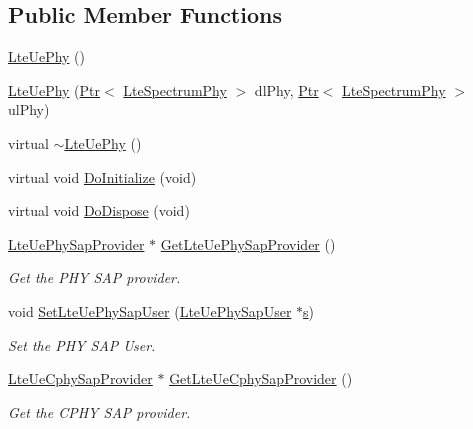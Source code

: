 \subsection*{Public Member Functions}
\begin{DoxyCompactItemize}
\item 
\hyperlink{classns3_1_1LteUePhy_a9de35ef78a3d373935b5e1fe6286feb3}{Lte\+Ue\+Phy} ()
\item 
\hyperlink{classns3_1_1LteUePhy_aadd411255bbee37238dab6ca153153c0}{Lte\+Ue\+Phy} (\hyperlink{classns3_1_1Ptr}{Ptr}$<$ \hyperlink{classns3_1_1LteSpectrumPhy}{Lte\+Spectrum\+Phy} $>$ dl\+Phy, \hyperlink{classns3_1_1Ptr}{Ptr}$<$ \hyperlink{classns3_1_1LteSpectrumPhy}{Lte\+Spectrum\+Phy} $>$ ul\+Phy)
\item 
virtual \hyperlink{classns3_1_1LteUePhy_ab6a6fe5701e88e2fb3c4e69ecc6c867e}{$\sim$\+Lte\+Ue\+Phy} ()
\item 
virtual void \hyperlink{classns3_1_1LteUePhy_a09daf3f8475e2e1c4639b552d5381d7a}{Do\+Initialize} (void)
\item 
virtual void \hyperlink{classns3_1_1LteUePhy_aa562e7a618a1d007bad190e82da2768e}{Do\+Dispose} (void)
\item 
\hyperlink{classns3_1_1LteUePhySapProvider}{Lte\+Ue\+Phy\+Sap\+Provider} $\ast$ \hyperlink{classns3_1_1LteUePhy_a2f61c01194d6a3269ab1ae5a3cd12659}{Get\+Lte\+Ue\+Phy\+Sap\+Provider} ()
\begin{DoxyCompactList}\small\item\em Get the P\+HY S\+AP provider. \end{DoxyCompactList}\item 
void \hyperlink{classns3_1_1LteUePhy_a54da135ed894c4050eab1d9137701a44}{Set\+Lte\+Ue\+Phy\+Sap\+User} (\hyperlink{classns3_1_1LteUePhySapUser}{Lte\+Ue\+Phy\+Sap\+User} $\ast$\hyperlink{generate__test__data__lte__sinr_8m_ad83eeb3a142285d1243a08c6b7026df8}{s})
\begin{DoxyCompactList}\small\item\em Set the P\+HY S\+AP User. \end{DoxyCompactList}\item 
\hyperlink{classns3_1_1LteUeCphySapProvider}{Lte\+Ue\+Cphy\+Sap\+Provider} $\ast$ \hyperlink{classns3_1_1LteUePhy_ac849d1e35435778e0c24a8fc096d72f3}{Get\+Lte\+Ue\+Cphy\+Sap\+Provider} ()
\begin{DoxyCompactList}\small\item\em Get the C\+P\+HY S\+AP provider. \end{DoxyCompactList}\item 

\end{DoxyCompactItemize}
